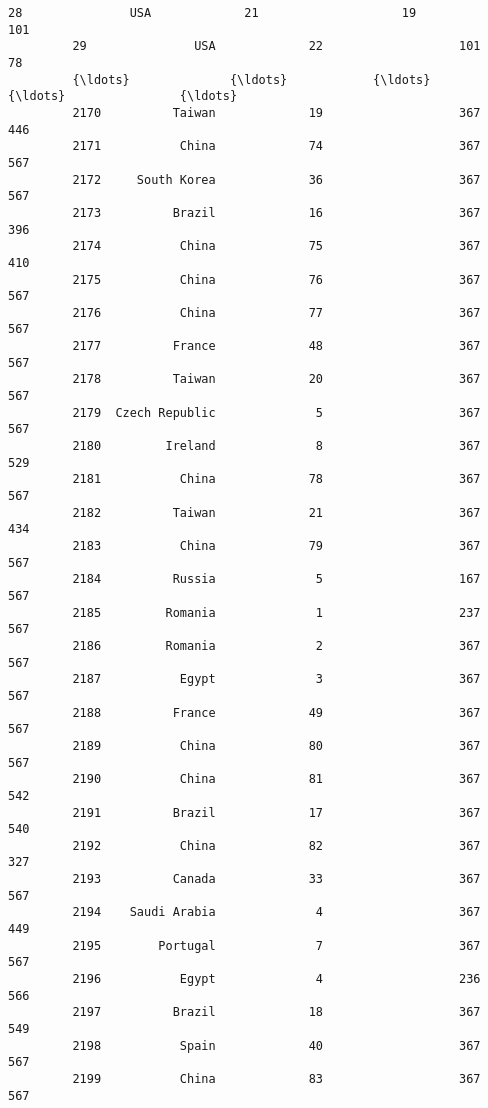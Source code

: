 \documentclass[11pt]{article}
\begin{document}
\begin{Verbatim}[commandchars=\\\{\}]
         28               USA             21                    19                101   
         29               USA             22                   101                 78   
         {\ldots}              {\ldots}            {\ldots}                   {\ldots}                {\ldots}   
         2170          Taiwan             19                   367                446   
         2171           China             74                   367                567   
         2172     South Korea             36                   367                567   
         2173          Brazil             16                   367                396   
         2174           China             75                   367                410   
         2175           China             76                   367                567   
         2176           China             77                   367                567   
         2177          France             48                   367                567   
         2178          Taiwan             20                   367                567   
         2179  Czech Republic              5                   367                567   
         2180         Ireland              8                   367                529   
         2181           China             78                   367                567   
         2182          Taiwan             21                   367                434   
         2183           China             79                   367                567   
         2184          Russia              5                   167                567   
         2185         Romania              1                   237                567   
         2186         Romania              2                   367                567   
         2187           Egypt              3                   367                567   
         2188          France             49                   367                567   
         2189           China             80                   367                567   
         2190           China             81                   367                542   
         2191          Brazil             17                   367                540   
         2192           China             82                   367                327   
         2193          Canada             33                   367                567   
         2194    Saudi Arabia              4                   367                449   
         2195        Portugal              7                   367                567   
         2196           Egypt              4                   236                566   
         2197          Brazil             18                   367                549   
         2198           Spain             40                   367                567   
         2199           China             83                   367                567   
         

\end{Verbatim}
\end{document}
